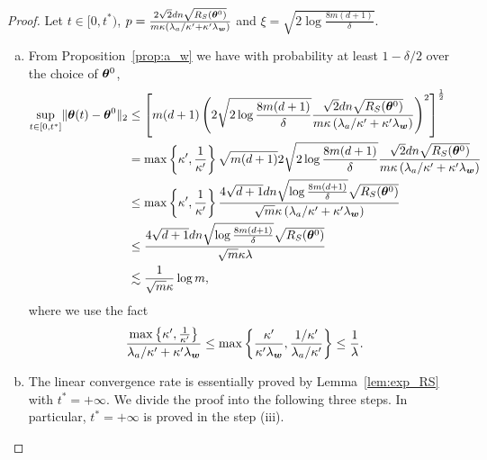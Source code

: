\documentclass{article}
\begin{document}
\begin{proof}
    Let $t\in[0,t^*)$, $p=\frac{2\sqrt{2}dn\sqrt{R_S(\bm{\theta}^0)}}{m\kappa\left(\lambda_a/\kappa'+\kappa'\lambda_{\bm{w}}\right)}$ and $\xi=\sqrt{2\log\frac{8m(d+1)}{\delta}}$.
    \begin{enumerate}[(a)]
        \item From Proposition~\ref{prop:a_w} we have with probability at least $1-\delta/2$ over the choice of $\bm{\theta}^0$,
              \begin{equation*}
                  \begin{aligned}
                      \sup\limits_{t\in[0,t^*]}\lVert\bm{\theta}(t)-\bm{\theta}^0\rVert_2
                       & \leq \left[m(d+1)\left(2\sqrt{2\log\frac{8m(d+1)}{\delta}}\frac{\sqrt{2}dn\sqrt{R_S(\bm{\theta}^0)}}{m\kappa\left(\lambda_a/\kappa'+\kappa'\lambda_{\bm{w}}\right)}\right)^2\right]^{\frac{1}{2}}      \\
                       & =\max\left\{\kappa',\frac{1}{\kappa'}\right\}\sqrt{m(d+1)}2\sqrt{2\log\frac{8m(d+1)}{\delta}}\frac{\sqrt{2}dn\sqrt{R_S(\bm{\theta}^0)}}{m\kappa\left(\lambda_a/\kappa'+\kappa'\lambda_{\bm{w}}\right)} \\
                       & \leq\max\left\{\kappa',\frac{1}{\kappa'}\right\}\frac{4\sqrt{d+1}dn\sqrt{\log\frac{8m(d+1)}{\delta}}\sqrt{R_S(\bm{\theta}^0)}}{\sqrt{m}\kappa\left(\lambda_a/\kappa'+\kappa'\lambda_{\bm{w}}\right)}   \\
                       & \leq\frac{4\sqrt{d+1}dn\sqrt{\log\frac{8m(d+1)}{\delta}}\sqrt{R_S(\bm{\theta}^0)}}{\sqrt{m}\kappa\lambda}                                                                                           \\
                       & \lesssim \frac{1}{\sqrt{m}\kappa}\log m,
                  \end{aligned}
              \end{equation*}
              where we use the fact
              \begin{equation*}
                  \frac{\max\left\{\kappa',\frac{1}{\kappa'}\right\}}{\lambda_a/\kappa'+\kappa'\lambda_{\bm{w}}}\leq\max\left\{\frac{\kappa'}{\kappa'\lambda_{\bm{w}}},\frac{1/\kappa'}{\lambda_a/\kappa'}\right\}\leq\frac{1}{\lambda}.
              \end{equation*}
        \item The linear convergence rate is essentially proved by Lemma~\ref{lem:exp_RS} with $t^* = +\infty$. We divide the proof into the following three steps. In particular, $t^*=+\infty$ is proved in the step (iii).
              \begin{enumerate}[(i)]

\end{enumerate}
\end{enumerate}
\end{proof}
\end{document}
